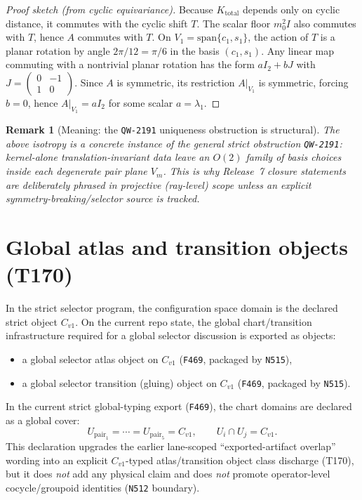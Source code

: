 \documentclass[11pt,a4paper]{article}
\newtheorem{remark}{Remark}[section]
\begin{document}
\begin{proof}[Proof sketch (from cyclic equivariance)]
Because $K_{\mathrm{total}}$ depends only on cyclic distance, it commutes with the cyclic shift $T$.
The scalar floor $m_0^2 I$ also commutes with $T$, hence $A$ commutes with $T$.
On $V_1=\mathrm{span}\{c_1,s_1\}$, the action of $T$ is a planar rotation by angle $2\pi/12=\pi/6$ in the basis $(c_1,s_1)$.
Any linear map commuting with a nontrivial planar rotation has the form $a I_2 + b J$ with $J=\begin{pmatrix}0&-1\\1&0\end{pmatrix}$.
Since $A$ is symmetric, its restriction $A|_{V_1}$ is symmetric, forcing $b=0$, hence $A|_{V_1}=a I_2$ for some scalar $a=\lambda_1$.
\end{proof}

\begin{remark}[Meaning: the \texttt{QW-2191} uniqueness obstruction is structural]
The above isotropy is a concrete instance of the general strict obstruction \texttt{QW-2191}:
kernel-alone translation-invariant data leave an $O(2)$ family of basis choices inside each degenerate pair plane $V_m$.
This is why Release~7 closure statements are deliberately phrased in \emph{projective (ray-level)} scope unless an explicit symmetry-breaking/selector source is tracked.
\end{remark}
\section{Global atlas and transition objects (T170)}

In the strict selector program, the configuration space domain is the declared strict object $C_{v1}$.
On the current repo state, the global chart/transition infrastructure required for a global selector discussion is exported as objects:

\begin{itemize}
  \item a global selector atlas object on $C_{v1}$ (\texttt{F469}, packaged by \texttt{N515}),
  \item a global selector transition (gluing) object on $C_{v1}$ (\texttt{F469}, packaged by \texttt{N515}).
\end{itemize}

In the current strict global-typing export (\texttt{F469}), the chart domains are declared as a global cover:
\[
U_{\mathrm{pair}_1}=\cdots=U_{\mathrm{pair}_5}=C_{v1},
\qquad
U_i\cap U_j=C_{v1}.
\]
This declaration upgrades the earlier lane-scoped “exported-artifact overlap” wording into an explicit $C_{v1}$-typed atlas/transition object class discharge (T170),
but it does \emph{not} add any physical claim and does \emph{not} promote operator-level cocycle/groupoid identities (\texttt{N512} boundary).
\end{document}
